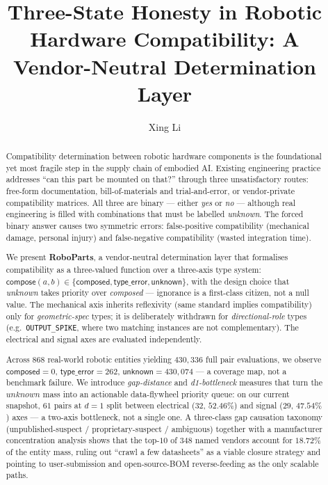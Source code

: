 \documentclass[review]{elsarticle}
\begin{document}
\begin{frontmatter}

\title{Three-State Honesty in Robotic Hardware Compatibility:
       A Vendor-Neutral Determination Layer}

\author[inst1]{Xing Li}



\begin{abstract}
Compatibility determination between robotic hardware components is the
foundational yet most fragile step in the supply chain of embodied AI.
Existing engineering practice addresses ``can this part be mounted on
that?'' through three unsatisfactory routes: free-form documentation,
bill-of-materials and trial-and-error, or vendor-private compatibility
matrices. All three are binary --- either \emph{yes} or \emph{no} ---
although real engineering is filled with combinations that must be
labelled \emph{unknown}. The forced binary answer causes two symmetric
errors: false-positive compatibility (mechanical damage, personal
injury) and false-negative compatibility (wasted integration time).

We present \textbf{RoboParts}, a vendor-neutral determination layer
that formalises compatibility as a three-valued function over a
three-axis type system:
$\mathsf{compose}(a,b) \in \{\mathsf{composed}, \mathsf{type\_error}, \mathsf{unknown}\}$,
with the design choice that \emph{unknown} takes priority over
\emph{composed} --- ignorance is a first-class citizen, not a null value.
The mechanical axis inherits reflexivity (same standard implies
compatibility) only for \emph{geometric-spec} types; it is deliberately
withdrawn for \emph{directional-role} types (e.g.\ \texttt{OUTPUT\_SPIKE},
where two matching instances are not complementary). The electrical and
signal axes are evaluated independently.

Across $868$ real-world robotic entities yielding $430{,}336$ full
pair evaluations, we observe $\mathsf{composed}=0$,
$\mathsf{type\_error}=262$, $\mathsf{unknown}=430{,}074$ --- a coverage
map, not a benchmark failure. We introduce \emph{gap-distance} and
\emph{d1-bottleneck} measures that turn the $unknown$ mass into an
actionable data-flywheel priority queue: on our current snapshot,
$61$ pairs at $d=1$ split between electrical ($32$, $52.46\%$) and
signal ($29$, $47.54\%$) axes --- a two-axis bottleneck, not a single
one. A three-class gap causation taxonomy
(unpublished-suspect / proprietary-suspect / ambiguous) together with
a manufacturer concentration analysis shows that the top-$10$ of $348$
named vendors account for $18.72\%$ of the entity mass, ruling out
``crawl a few datasheets'' as a viable closure strategy and pointing
to user-submission and open-source-BOM reverse-feeding as the only
scalable paths.
\end{abstract}


\end{frontmatter}
\end{document}
